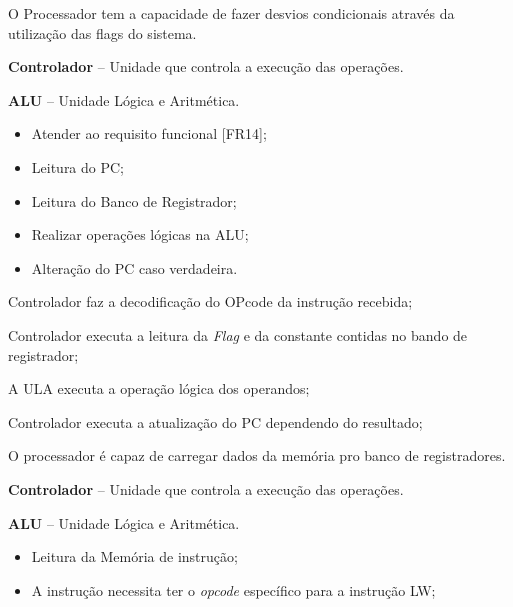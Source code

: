 \documentclass{article}
\begin{document}
  O Processador tem a capacidade de fazer desvios condicionais atrav\'{e}s da utilização das flags do sistema.
  \actors
    \begin{description}
     \item \textbf{Controlador} – Unidade que controla a execução das operações.
     \item \textbf{ALU} – Unidade L\'{o}gica e Aritm\'{e}tica.
    \end{description}
    
  \preconditions 
    \begin{itemize}
     \item Atender ao requisito funcional [FR14];
     \item Leitura do PC;
     \item Leitura do Banco de Registrador;
     \item Realizar operações lógicas na ALU;
    \end{itemize}

  \postconditions
    \begin{itemize}
     \item Alteração do PC caso verdadeira.
    \end{itemize}
  
  
  \begin{mainflow}
    \item Controlador faz a decodificação do OPcode da instrução recebida;
    \item Controlador executa a leitura da \textit{Flag} e da constante contidas no bando de registrador;
    \item A ULA executa a operação lógica dos operandos;
    \item Controlador executa a atualização do PC dependendo do resultado;
  \end{mainflow}
  
  O processador é capaz de carregar dados da memória pro banco de registradores.
  \actors
    \begin{description}
     \item \textbf{Controlador} – Unidade que controla a execução das operações.
     \item \textbf{ALU} – Unidade L\'{o}gica e Aritm\'{e}tica.
    \end{description}
    
  \preconditions 
    \begin{itemize}
     \item Leitura da Memória de instrução;
     \item A instrução necessita ter o \textit{opcode} específico para a instrução LW;
    \end{itemize}
\end{document}
